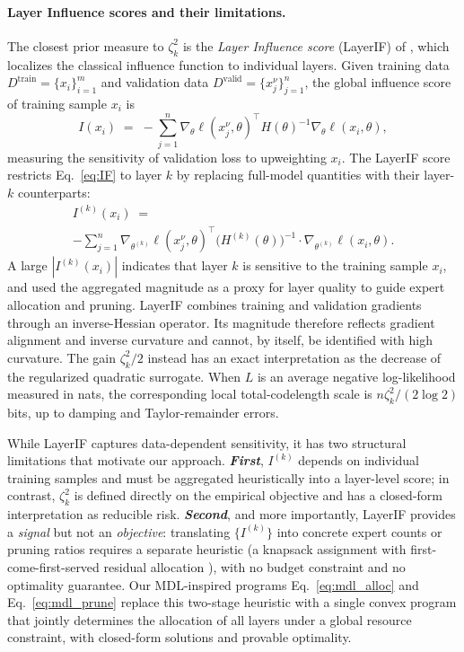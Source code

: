 \documentclass[accepted]{uai2026}%
\theoremstyle{remark}%
\begin{document}
\paragraph{Layer Influence scores and their limitations.}
The closest prior measure to $\zeta_k^2$ is the \emph{Layer Influence
score} (LayerIF) of \citet{layerIF}, which localizes the classical
influence function \citep{koh2017understanding} to individual layers.
Given training data $D^{\mathrm{train}} = \{x_i\}_{i=1}^{m}$ and
validation data $D^{\mathrm{valid}} = \{x_j^\nu\}_{j=1}^{n}$,
the global influence score of training sample $x_i$ is
\begin{equation}
  \label{eq:IF}
  I(x_i)
  \;=\;
  -\sum_{j=1}^{n}
  \nabla_{\theta}\ell(x_j^\nu, \theta)^{\top}
  H(\theta)^{-1}
  \nabla_{\theta}\ell(x_i, \theta),
\end{equation}
measuring the sensitivity of validation loss to upweighting $x_i$.
The LayerIF score restricts Eq.~\eqref{eq:IF} to layer $k$ by replacing
full-model quantities with their layer-$k$ counterparts:
\begin{multline}
I^{(k)}(x_i)
\;=\; \\
-\sum_{j=1}^{n}
\nabla_{\theta^{(k)}}\ell(x_j^\nu, \theta)^{\top}
\bigl(H^{(k)}(\theta)\bigr)^{-1}
\cdot\nabla_{\theta^{(k)}}\ell(x_i, \theta).
\label{eq:layerIF}
\end{multline}
A large $|I^{(k)}(x_i)|$ indicates that layer $k$ is sensitive to
the training sample $x_i$, and \citet{layerIF} used the aggregated
magnitude as a proxy for layer quality to guide expert allocation and
pruning.
LayerIF combines training and validation gradients through an
inverse-Hessian operator. Its magnitude therefore reflects gradient alignment
and inverse curvature and cannot, by itself, be identified with high curvature.
The gain $\zeta_k^2/2$ instead has an exact interpretation as the decrease of
the regularized quadratic surrogate. When $L$ is an average negative
log-likelihood measured in nats, the corresponding local total-codelength scale
is $n\zeta_k^2/(2\log 2)$ bits, up to damping and Taylor-remainder errors.

 While LayerIF captures data-dependent sensitivity, it has two
structural limitations that motivate our approach.
\textit{\textbf{First}}, $I^{(k)}$ depends on individual training samples and must be
aggregated heuristically into a layer-level score;
in contrast, $\zeta_k^2$ is defined directly on the empirical
objective and has a closed-form interpretation as reducible risk.
\textit{\textbf{Second}}, and more importantly, LayerIF provides a \emph{signal} but
not an \emph{objective}: translating $\{I^{(k)}\}$ into concrete
expert counts or pruning ratios requires a separate heuristic
(a knapsack assignment with first-come-first-served residual
allocation \citep{layerIF}), with no budget constraint and no
optimality guarantee.
Our MDL-inspired programs Eq.~\eqref{eq:mdl_alloc} and Eq.~\eqref{eq:mdl_prune}
replace this two-stage heuristic with a single convex program
that jointly determines the allocation of all layers under a global
resource constraint, with closed-form solutions and provable
optimality.
\end{document}
